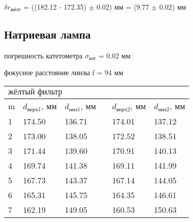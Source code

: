 \documentclass[a4paper, 12pt]{article}
\begin{document}
$\delta r_{\text{жёлт}}$ = ((182.12 - 172.35) $\pm$ 0.02) мм = (9.77 $\pm$ 0.02) мм


\subsection{Натриевая лампа}
 погрешность катетометра $\sigma_{кат}$ = 0.02 мм
 \par
 фокусное расстояние линзы f = 94 мм

\begin{table}[h]
\centering
\begin{tabular}{|llllll|}
\hline
\multicolumn{6}{|l|}{$\text{жёлтый фильтр}$}                                                                                                                                                                                       \\ \hline
\multicolumn{1}{|l|}{m} & \multicolumn{1}{l|}{$d_{\text{верх} 1}$, мм} & \multicolumn{1}{l|}{$d_{\text{низ}1}$, мм} & \multicolumn{1}{l|}{} & \multicolumn{1}{l|}{$d_{\text{верх}2}$, мм} & $d_{\text{низ}2}$, мм \\ \cline{1-3} \cline{5-6} 
\multicolumn{1}{|l|}{1} & \multicolumn{1}{l|}{174.50}                  & \multicolumn{1}{l|}{136.71}                & \multicolumn{1}{l|}{}                  & \multicolumn{1}{l|}{174.01}                 & 137.12                \\ \cline{1-3} \cline{5-6} 
\multicolumn{1}{|l|}{2} & \multicolumn{1}{l|}{173.00}                  & \multicolumn{1}{l|}{138.05}                & \multicolumn{1}{l|}{}                  & \multicolumn{1}{l|}{172.52}                 & 138.51                \\ \cline{1-3} \cline{5-6} 
\multicolumn{1}{|l|}{3} & \multicolumn{1}{l|}{171.44}                  & \multicolumn{1}{l|}{139.60}                & \multicolumn{1}{l|}{}                  & \multicolumn{1}{l|}{170.91}                 & 140.13                \\ \cline{1-3} \cline{5-6} 
\multicolumn{1}{|l|}{4} & \multicolumn{1}{l|}{169.74}                  & \multicolumn{1}{l|}{141.38}                & \multicolumn{1}{l|}{}                  & \multicolumn{1}{l|}{169.11}                 & 141.99                \\ \cline{1-3} \cline{5-6} 
\multicolumn{1}{|l|}{5} & \multicolumn{1}{l|}{167.73}                  & \multicolumn{1}{l|}{143.37}                & \multicolumn{1}{l|}{}                  & \multicolumn{1}{l|}{167.14}                 & 144.05                \\ \cline{1-3} \cline{5-6} 
\multicolumn{1}{|l|}{6} & \multicolumn{1}{l|}{165.31}                  & \multicolumn{1}{l|}{145.75}                & \multicolumn{1}{l|}{}                  & \multicolumn{1}{l|}{164.35}                 & 146.61                \\ \cline{1-3} \cline{5-6} 
\multicolumn{1}{|l|}{7} & \multicolumn{1}{l|}{162.19}                  & \multicolumn{1}{l|}{149.05}                & \multicolumn{1}{l|}{}                  & \multicolumn{1}{l|}{160.53}                 & 150.63                \\ \hline
\end{tabular}
\end{table}
\end{document}
